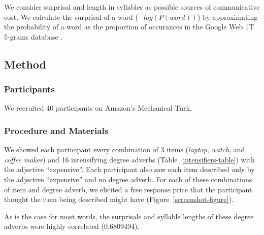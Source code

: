 \documentclass[10pt,letterpaper]{article}
\begin{document}
  We consider surprisal and length in syllables as possible sources of communicative cost. We calculate the surprisal of a word ($-log(P(word))$) by approximating the probability of a word as the proportion of occurances in the Google Web 1T 5-grams database \cite{web1t5gram}.
  
  \subsection{Method}
    \subsubsection{Participants}
      We recruited 40 participants on Amazon's Mechanical Turk.
    \subsubsection{Procedure and Materials}
      We showed each participant every combination of 3 items (\emph{laptop}, \emph{watch}, and \emph{coffee maker}) and 16 intensifying degree adverbs (Table~\ref{intensifiers-table}) with the adjective ``expensive''. Each participant also saw each item described only by the adjective ``expensive'' and no degree adverb. For each of these combinations of item and degree adverb, we elicited a free response price that the participant thought the item being described might have (Figure~\ref{screenshot-figure}).
      
       As is the case for most words, the surprisals and syllable lengths of these degree adverbs were highly correlated (0.6809494).
      
\end{document}
